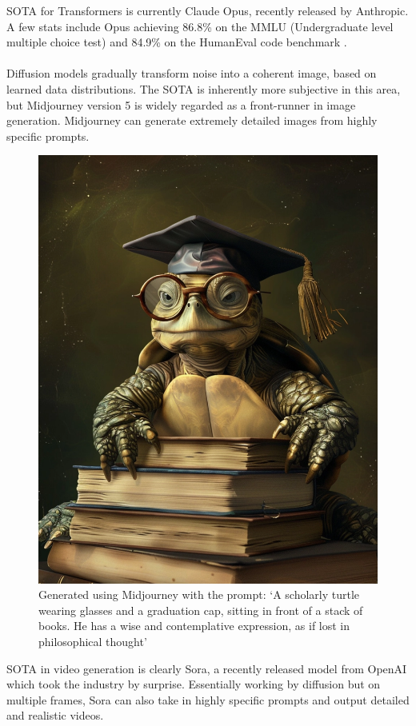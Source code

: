 \documentclass[12pt,a4paper]{article}
\begin{document}
\noindent SOTA for Transformers is currently Claude Opus, recently released by Anthropic. A few stats include Opus achieving 86.8\% on the MMLU (Undergraduate level multiple choice test) and 84.9\% on the HumanEval code benchmark \cite{opus}.
\\\\
Diffusion models gradually transform noise into a coherent image, based on learned data distributions. The SOTA is inherently more subjective in this area, but Midjourney version 5 is widely regarded as a front-runner in image generation. Midjourney can generate extremely detailed images from highly specific prompts.
\begin{figure}[H]
    \centering
    \includegraphics[scale=0.4]{turtle.png}
    \caption{Generated using Midjourney with the prompt: `A scholarly turtle wearing glasses and a graduation cap, sitting in front of a stack of books. He has a wise and contemplative expression, as if lost in philosophical thought'}
\end{figure}
\noindent SOTA in video generation is clearly Sora, a recently released model from OpenAI which took the industry by surprise. Essentially working by diffusion but on multiple frames, Sora can also take in highly specific prompts and output detailed and realistic videos. 
\end{document}
